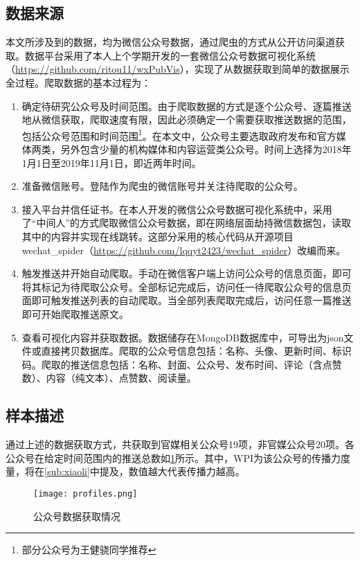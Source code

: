 \documentclass[a4paper,12pt]{article}
\begin{document}
    \subsection{数据来源}
    本文所涉及到的数据，均为微信公众号数据，通过爬虫的方式从公开访问渠道获取。数据平台采用了本人上个学期开发的一套微信公众号数据可视化系统（\url{https://github.com/ritou11/wxPubVis}），实现了从数据获取到简单的数据展示全过程。爬取数据的基本过程为：
    \begin{enumerate}
      \item 确定待研究公众号及时间范围。由于爬取数据的方式是逐个公众号、逐篇推送地从微信获取，爬取速度有限，因此必须确定一个需要获取推送数据的范围，包括公众号范围和时间范围\thanks{部分公众号为王健骁同学推荐}。在本文中，公众号主要选取政府发布和官方媒体两类，另外包含少量的机构媒体和内容运营类公众号。时间上选择为2018年1月1日至2019年11月1日，即近两年时间。
      \item 准备微信账号。登陆作为爬虫的微信账号并关注待爬取的公众号。
      \item 接入平台并信任证书。在本人开发的微信公众号数据可视化系统中，采用了“中间人”的方式爬取微信公众号数据，即在网络层面劫持微信数据包，读取其中的内容并实现在线跳转。这部分采用的核心代码从开源项目wechat\_spider（\url{https://github.com/lqqyt2423/wechat_spider}）改编而来。
      \item 触发推送并开始自动爬取。手动在微信客户端上访问公众号的信息页面，即可将其标记为待爬取公众号。全部标记完成后，访问任一待爬取公众号的信息页面即可触发推送列表的自动爬取。当全部列表爬取完成后，访问任意一篇推送即可开始爬取推送原文。
      \item 查看可视化内容并获取数据。数据储存在MongoDB数据库中，可导出为json文件或直接拷贝数据库。爬取的公众号信息包括：名称、头像、更新时间、标识码。爬取的推送信息包括：名称、封面、公众号、发布时间、评论（含点赞数）、内容（纯文本）、点赞数、阅读量。
    \end{enumerate}
    \subsection{样本描述}
    通过上述的数据获取方式，共获取到官媒相关公众号19项，非官媒公众号20项。各公众号在给定时间范围内的推送总数如\cref{fig:profiles}所示。其中，WPI为该公众号的传播力度量，将在\cref{sub:xiaoli}中提及，数值越大代表传播力越高。
    \begin{figure}
      \centering
      \texttt{[image: profiles.png]}
      \caption{公众号数据获取情况}
      \label{fig:profiles}
    \end{figure}
    
\end{document}
